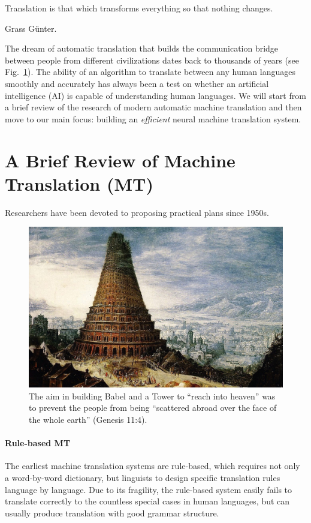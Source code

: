 \epigraph{Translation is that which transforms everything so that nothing changes.}{Grass Günter.}

The dream of automatic translation that builds the communication bridge between people from different civilizations dates back to thousands of years (see Fig.~\ref{cp1.fig.babel}). The ability of an algorithm  to translate between any human languages smoothly and accurately has always been a test on whether an artificial intelligence (AI) is capable of understanding human languages. We will start from a brief review of the research of modern automatic machine translation and then move to our main focus: building an {\it efficient} neural machine translation system.

\section{A Brief Review of Machine Translation (MT)}
Researchers have been devoted to proposing practical plans since 1950s.
\begin{figure}[t]
	\centering
	\includegraphics[width=1\linewidth]{figs/intro/tower_of_babel.jpg}
	\caption{\label{cp1.fig.babel}The aim in building Babel and a Tower to “reach into heaven” was to prevent the people from being “scattered abroad over the face of the whole earth” (Genesis 11:4). }
\end{figure}

\paragraph{Rule-based MT} The earliest machine translation systems are rule-based, which requires not only a word-by-word dictionary, but linguists to design specific translation rules language by language. Due to its fragility, the rule-based system easily fails to translate correctly to the countless special cases in human languages, but can usually produce translation with good grammar structure.

